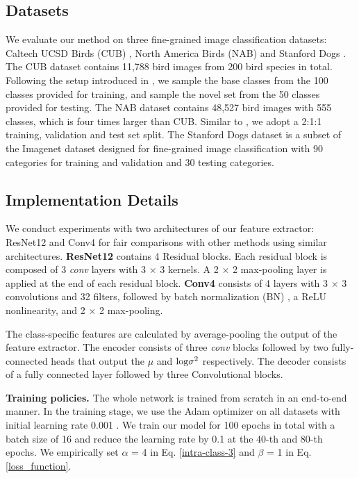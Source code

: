 \documentclass[10pt,twocolumn,letterpaper]{article}
\begin{document}
  \subsection{Datasets} 
  We evaluate our method on three fine-grained image classification datasets: Caltech UCSD Birds (CUB) \cite{cub}, North America Birds (NAB) \cite{nab} and Stanford Dogs \cite{dog}.
The CUB dataset contains 11,788 bird images from 200 bird species in total.
Following the setup introduced in \cite{cub}, we sample the base classes from the 100 classes provided for training, and sample the novel set from the 50 classes provided for testing.
The NAB dataset  contains 48,527 bird images with 555 classes, which is four times larger than CUB. Similar to \cite{metair_gan}, we adopt a 2:1:1 training, validation and test set split.
The Stanford Dogs dataset is a subset of the Imagenet dataset designed for fine-grained image classification with 90 categories for training and validation and 30 testing categories.
     
     \subsection{Implementation Details}
      We conduct experiments with two architectures of our feature extractor: ResNet12 and Conv4 for fair comparisons with other methods using similar architectures.
      \textbf{ResNet12} \cite{resnet} contains 4 Residual blocks. Each residual block is composed of 3 \textit{conv} layers with 3 $\times$ 3 kernels.
      A 2 $\times$ 2 max-pooling layer is applied at the end of each residual block.  
      \textbf{Conv4} consists of 4 layers with 3 $\times$ 3 convolutions
      and 32 filters, followed by batch normalization (BN) ,
      a ReLU nonlinearity, and 2 $\times$ 2 max-pooling.
      
The class-specific features are calculated by average-pooling the output of the feature extractor.
The encoder consists of three \textit{conv} blocks followed by two fully-connected heads that output the $\mu$ and $\textnormal{log}\sigma^2$ respectively.
The decoder consists of a fully connected layer followed by three Convolutional blocks.




     


      \textbf{Training policies.} The whole network is trained from scratch in an end-to-end manner. In the training stage, we use
      the Adam optimizer \cite{adam_optimizer} on all datasets with initial learning rate 0.001
      . 
      We train our model for 100 epochs in total with
      a batch size of 16 and reduce the learning rate by 0.1 at the 40-th and 80-th epochs. 
      We empirically set $\alpha$ = 4 in Eq. \ref{intra-class-3} and $\beta$ = 1 in Eq.\ref{loss_function}. 
      
\end{document}
